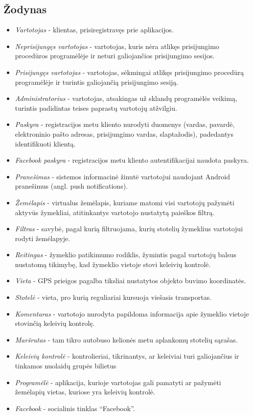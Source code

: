 \documentclass{VUMIFPSkursinis}
\begin{document}
\subsection{Žodynas}
				\renewcommand{\labelitemi}{$\bullet$}
				\begin{itemize}
					\item \textit{Vartotojas} - klientas, prisiregistravęs prie aplikacijos.
					\item \textit{Neprisijungęs vartotojas} - vartotojas, kuris nėra atlikęs prisijungimo procedūros programėlėje ir neturi galiojančios prisijungimo sesijos.
					\item \textit{Prisijungęs vartotojas} - vartotojas, sėkmingai atlikęs prisijungimo procedūrą programėlėje ir turintis galiojančią prisijungimo sesiją.
					\item \textit{Administratorius} - vartotojas, atsakingas už sklandų programėlės veikimą, turintis padidintas teises paprastų vartotojų atžvilgiu.
					\item \textit{Paskyra} - registracijos metu kliento nurodyti duomenys (vardas, pavardė, elektroninio pašto adresas, prisijungimo vardas, slaptažodis), padedantys identifikuoti klientą.
					\item \textit{Facebook paskyra} - registracijos metu kliento autentifikacijai naudota paskyra.
					\item \textit{Pranešimas} - sistemos informacinė žinutė vartotojui naudojant Android pranešimus (angl. push notifications).
					\item \textit{Žemėlapis} - virtualus žemėlapis, kuriame matomi visi vartotojų pažymėti aktyvūs žymekliai, atitinkantys vartotojo nustatytą paieškos filtrą.
					\item \textit{Filtras} - savybė, pagal kurią filtruojama, kurių stotelių žymeklius vartotojui rodyti žemėlapyje.
					\item \textit{Reitingas} - žymeklio patikimumo rodiklis, žymintis pagal vartotojų balsus nustatomą tikimybę, kad žymeklio vietoje stovi keleivių kontrolė. 
					\item \textit{Vieta} - GPS prieigos pagalba tiksliai nustatytos objekto buvimo koordinatės.
					\item \textit{Stotelė} - vieta, pro kurią reguliariai kursuoja viešasis transportas.
					\item \textit{Komentaras} - vartotojo nurodyta papildoma informacija apie žymeklio vietoje stovinčią keleivių kontrolę.
					\item \textit{Maršrutas} - tam tikro autobuso kelionės metu aplankomų stotelių sąrašas.
					\item \textit{Keleivių kontrolė} - kontrolieriai, tikrinantys, ar keleiviai turi galiojančius ir tinkamos nuolaidų grupės bilietus
					\item \textit{Programėlė} - aplikacija, kurioje vartotojas gali pamatyti ar pažymėti žemėlapių vietas, kuriose yra keleivių kontrolė.
					\item \textit{Facebook} - socialinis tinklas “Facebook”.
				\end{itemize}
\end{document}
